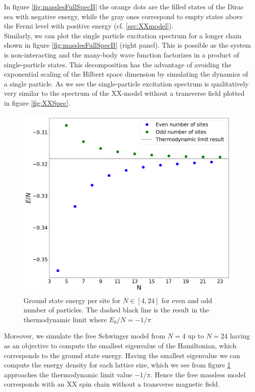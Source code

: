In figure \ref{fig:masslesFullSpecB} the orange dots are the filled states of the Dirac sea with negative energy, while the gray ones correspond to empty states above the Fermi level with positive energy (cf. \ref{sec:XXmodel}). \\

Similarly, we can plot the single particle excitation spectrum for a longer chain shown in figure \ref{fig:masslesFullSpecB} (right panel). This is possible as the system is non-interacting and the many-body wave function factorizes in a product of single-particle states. This decomposition has the advantage of avoiding the exponential scaling of the Hilbert space dimension by simulating the dynamics of a single particle. As we see the single-particle excitation spectrum is qualitatively very similar to the spectrum of the XX-model without a transverse field plotted in figure \ref{fig:XXSpec}.


\begin{figure}[htb]
    \centering
    \includegraphics[scale=0.25]{figures/GroundStateE.png}
    \caption{Ground state energy per site for $N\in[4,24]$ for even and odd number of particles. The dashed black line is the result in the thermodynamic limit where $E_0/N=-1/\pi$}
    \label{fig:GSenergy}
\end{figure}


Moreover, we simulate the free Schwinger model from $N=4$ up to $N=24$ having as an objective to compute the smallest eigenvalue of the Hamiltonian, which corresponds to the ground state energy. Having the smallest eigenvalue we can compute the energy density for each lattice size, which we see from figure \ref{fig:GSenergy} approaches the thermodynamic limit value $-1/\pi$. Hence the free massless model corresponds with an XX spin chain without a transverse magnetic field. \\


